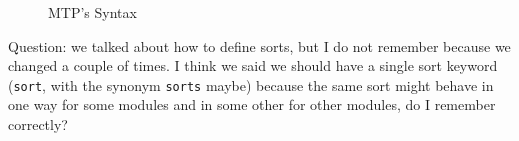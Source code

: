 

\begin{figure}[t]
\caption{MTP's Syntax}
\label{fig:syntax}
\end{figure}

{\color{red}Question:} we talked about how to define sorts, but I do not remember because
we changed a couple of times. I think we said we should have a single sort keyword (\texttt{sort},
with the synonym \texttt{sorts} maybe) because the same sort might behave in one way for some
modules and in some other for other modules, do I remember correctly?

